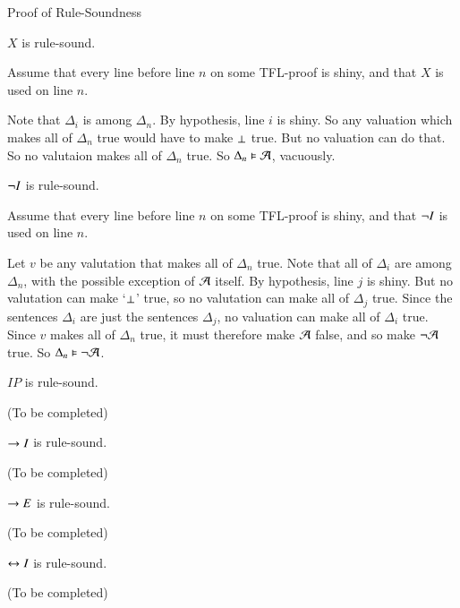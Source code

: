\documentclass[12pt, a4paper, twoside, openright, titlepage]{book}
\begin{document}
\begin{proof*}{Proof of Rule-Soundness}{}
    \begin{claim*}{7}{}
        $X$ is rule-sound.
    \end{claim*}
    Assume that every line before line $n$ on some TFL-proof is shiny, and that $X$ is used on line $n$.
    \begin{fitchproof}
         
    \end{fitchproof}
    Note that $\Delta_i$ is among $\Delta_n$. By hypothesis, line $i$ is shiny. So any valuation which makes all of $\Delta_n$ true would have to make $\bot$ true. But no valuation can do that. So no valutaion makes all of $\Delta_n$ true. So $\Delta_n \vDash \mathcal{A}$, vacuously.


    \begin{claim*}{8}{}
        $\neg I$ is rule-sound.
    \end{claim*}
    Assume that every line before line $n$ on some TFL-proof is shiny, and that $\neg I$ is used on line $n$.
    \begin{fitchproof}
        \open
        \close
         
    \end{fitchproof}
    Let $v$ be any valutation that makes all of $\Delta_n$ true. Note that all of $\Delta_i$ are among $\Delta_n$, with the possible exception of $\mathcal{A}$ itself. By hypothesis, line $j$ is shiny. But no valutation can make `$\bot$' true, so no valutation can make all of $\Delta_j$ true. Since the sentences $\Delta_i$ are just the sentences $\Delta_j$, no valuation can make all of $\Delta_i$ true. Since $v$ makes all of $\Delta_n$ true, it must therefore make $\mathcal{A}$ false, and so make $\neg \mathcal{A}$ true. So $\Delta_n\vDash \neg\mathcal{A}$.

    \begin{claim*}{9}{}
        $IP$ is rule-sound.
    \end{claim*}
    (To be completed)

    \begin{claim*}{10}{}
        $\rightarrow I$ is rule-sound.
    \end{claim*}
    (To be completed)


    \begin{claim*}{11}{}
        $\rightarrow E$ is rule-sound.
    \end{claim*}
    (To be completed)


    \begin{claim*}{12}{}
        $\leftrightarrow I$ is rule-sound.
    \end{claim*}
    (To be completed)



\end{proof*}
\end{document}
